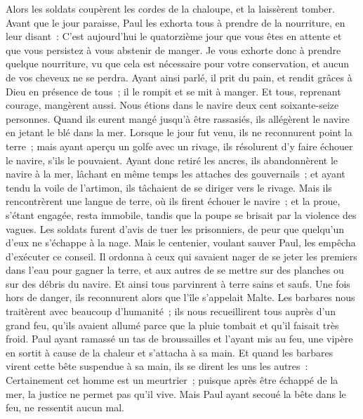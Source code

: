 \begin{multicols}{2}
Alors les soldats coupèrent les cordes de la chaloupe, et la laissèrent tomber.
Avant que le jour paraisse, Paul les exhorta tous à prendre de la nourriture, en leur disant~: C'est aujourd'hui le quatorzième jour que vous êtes en attente et que vous persistez à vous abstenir de manger.
Je vous exhorte donc à prendre quelque nourriture, vu que cela est nécessaire pour votre conservation, et aucun de vos cheveux ne se perdra.
Ayant ainsi parlé, il prit du pain, et rendit grâces à Dieu en présence de tous~; il le rompit et se mit à manger.
Et tous, reprenant courage, mangèrent aussi.
Nous étions dans le navire deux cent soixante-seize personnes.
Quand ils eurent mangé jusqu'à être rassasiés, ils allégèrent le navire en jetant le blé dans la mer.
Lorsque le jour fut venu, ils ne reconnurent point la terre~; mais ayant aperçu un golfe avec un rivage, ils résolurent d'y faire échouer le navire, s'ils le pouvaient.
Ayant donc retiré les ancres, ils abandonnèrent le navire à la mer, lâchant en même temps les attaches des gouvernails~; et ayant tendu la voile de l'artimon, ils tâchaient de se diriger vers le rivage.
Mais ils rencontrèrent une langue de terre, où ils firent échouer le navire~; et la proue, s'étant engagée, resta immobile, tandis que la poupe se brisait par la violence des vagues.
Les soldats furent d'avis de tuer les prisonniers, de peur que quelqu'un d'eux ne s'échappe à la nage.
Mais le centenier, voulant sauver Paul, les empêcha d'exécuter ce conseil. Il ordonna à ceux qui savaient nager de se jeter les premiers dans l'eau pour gagner la terre,
et aux autres de se mettre sur des planches ou sur des débris du navire. Et ainsi tous parvinrent à terre sains et saufs.
\VerseOne{}Une fois hors de danger, ils reconnurent alors que l'île s'appelait Malte.
Les barbares nous traitèrent avec beaucoup d'humanité~; ils nous recueillirent tous auprès d'un grand feu, qu'ils avaient allumé parce que la pluie tombait et qu'il faisait très froid.
Paul ayant ramassé un tas de broussailles et l'ayant mis au feu, une vipère en sortit à cause de la chaleur et s'attacha à sa main.
Et quand les barbares virent cette bête suspendue à sa main, ils se dirent les uns les autres~: Certainement cet homme est un meurtrier~; puisque après être échappé de la mer, la justice ne permet pas qu'il vive. 
Mais Paul ayant secoué la bête dans le feu, ne ressentit aucun mal.

\end{multicols}
